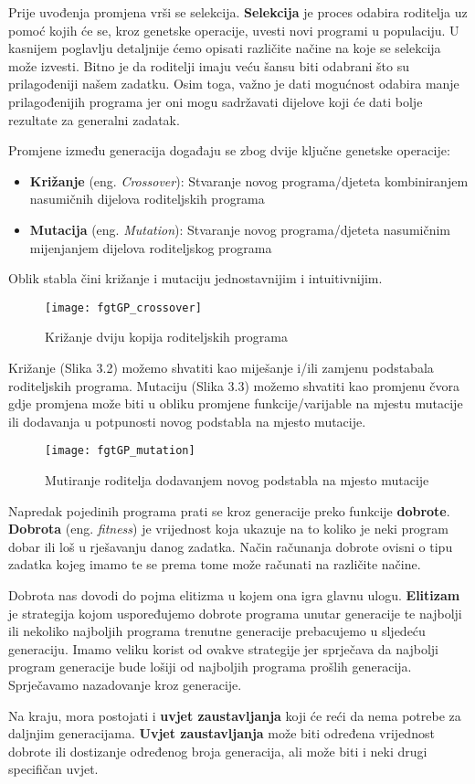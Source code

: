 Prije uvođenja promjena vrši se selekcija. \textbf{Selekcija} je proces odabira roditelja uz pomoć kojih će se, kroz genetske operacije, uvesti novi programi u populaciju. U kasnijem poglavlju detaljnije ćemo opisati različite načine na koje se selekcija može izvesti. Bitno je da roditelji imaju veću šansu biti odabrani što su prilagođeniji našem zadatku. Osim toga, važno je dati mogućnost odabira manje prilagođenijih programa jer oni mogu sadržavati dijelove koji će dati bolje rezultate za generalni zadatak. 
\par 
Promjene između generacija događaju se zbog dvije ključne genetske operacije: 
\begin{itemize}
	\item \textbf{Križanje} (eng. \textit{Crossover}): Stvaranje novog programa/djeteta kombiniranjem nasumičnih dijelova roditeljskih programa
	\item \textbf{Mutacija} (eng. \textit{Mutation}): Stvaranje novog programa/djeteta nasumičnim mijenjanjem dijelova roditeljskog programa
\end{itemize}
\par
Oblik stabla čini križanje i mutaciju jednostavnijim i intuitivnijim. 
	\begin{figure}[h]
		\centering
		\texttt{[image: fgtGP\_crossover]} 
		\caption{Križanje dviju kopija roditeljskih programa \cite{fieldguidtoGP}}
	\end{figure}
\newpage
\par
Križanje (Slika 3.2) možemo shvatiti kao miješanje i/ili zamjenu podstabala roditeljskih programa. Mutaciju (Slika 3.3) možemo shvatiti kao promjenu čvora gdje promjena može biti u obliku promjene funkcije/varijable na mjestu mutacije ili dodavanja u potpunosti novog podstabla na mjesto mutacije.\newline
	\begin{figure}[h]
		\centering
		\texttt{[image: fgtGP\_mutation]}
		\caption{Mutiranje roditelja dodavanjem novog podstabla na mjesto mutacije \cite{fieldguidtoGP}}
	\end{figure}
\par 
Napredak pojedinih programa prati se kroz generacije preko funkcije \textbf{dobrote}. \textbf{Dobrota} (eng. \textit{fitness}) je vrijednost koja ukazuje na to koliko je neki program dobar ili loš u rješavanju danog zadatka. Način računanja dobrote ovisni o tipu zadatka kojeg imamo te se prema tome može računati na različite načine.\par 
Dobrota nas dovodi do pojma elitizma u kojem ona igra glavnu ulogu. \textbf{Elitizam} je strategija kojom uspoređujemo dobrote programa unutar generacije te najbolji ili nekoliko najboljih programa trenutne generacije prebacujemo u sljedeću generaciju. Imamo veliku korist od ovakve strategije jer sprječava da najbolji program generacije bude lošiji od najboljih programa prošlih generacija. Sprječavamo nazadovanje kroz generacije.\par
Na kraju, mora postojati i \textbf{uvjet zaustavljanja} koji će reći da nema potrebe za daljnjim generacijama. \textbf{Uvjet zaustavljanja} može biti određena vrijednost dobrote ili dostizanje određenog broja generacija, ali može biti i neki drugi specifičan uvjet. 

	
